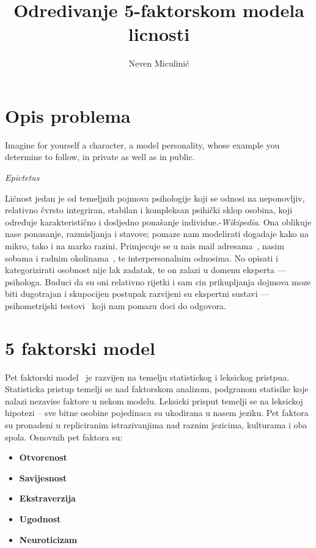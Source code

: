 \documentclass[times, utf8, seminar]{fer}
\begin{document}
\theoremstyle{definition}
\newtheorem{definition}{Definition}[section]

\title{Odredivanje 5-faktorskom modela licnosti}
\author{Neven Miculinić}

\maketitle
\tableofcontents

\chapter{Opis problema}

\epigraph{Imagine for yourself a character, a model personality, whose example you determine to follow, in private as well as in public.
}{\textit{Epictetus}}
Ličnost jedan je od temeljnih pojmova psihologije koji se odnosi na neponovljiv, relativno čvrsto integriran, stabilan i kompleksan psihički sklop osobina, koji određuje karakteristično i dosljedno ponašanje individue.-\textit{Wikipedia}.
Ona oblikuje nase ponasanje, razmisljanja i stavove; pomaze nam modelirati dogadaje kako na mikro, tako i na marko razini. Primjecuje se u nais mail adresama~\cite{mail-personality}, nasim sobama i radnim okolinama~\cite{gosling2002room}, te interpersonalnim odnosima.
No opisati i kategorizirati osobnost nije lak zadatak, te on zalazi u domenu eksperta --- psihologa.
Buduci da su oni relativno rijetki i sam cin prikupljanja dojmova moze biti dugotrajan i skupocijen postupak razvijeni su ekspertni sustavi --- psihometrijski testovi~\cite{cronbach1949essentials} koji nam pomazu doci do odgovora.

\chapter{5 faktorski model}

Pet faktorski model~\cite{mccrae1992introduction} je razvijen na temelju statistickog i leksickog pristpua. Statisticka pristup temelji se nad faktorskom analizom, podgranom statisike koje nalazi nezavise faktore u nekom modelu. Leksicki prisput temelji se na leksickoj hipotezi -- sve bitne osobine pojedinaca su ukodirana u nasem jeziku. Pet faktora su pronadeni u repliciranim istrazivanjima nad raznim jezicima, kulturama i oba spola. Osnovnih pet faktora su:

\begin{itemize}
    \item \textbf{Otvorenost}
    \item \textbf{Savijesnost}
    \item \textbf{Ekstraverzija}
    \item \textbf{Ugodnost}
    \item \textbf{Neuroticizam}
\end{itemize}
\end{document}
